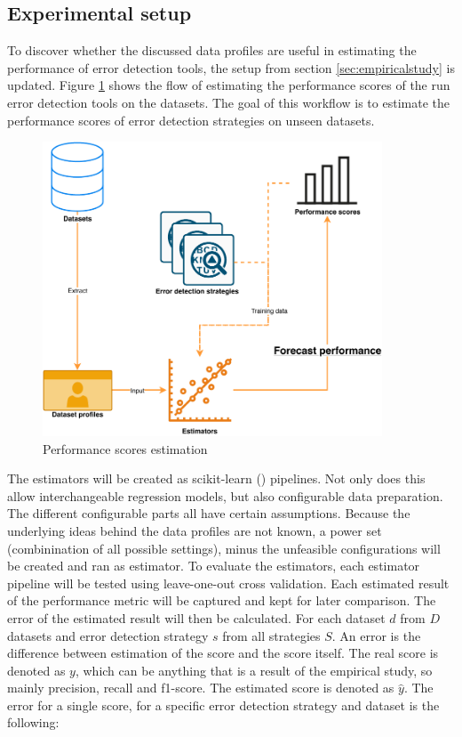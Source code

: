 \subsection{Experimental setup}
To discover whether the discussed data profiles are useful in estimating the performance of error detection tools, the setup from section \ref{sec:empiricalstudy} is updated. Figure \ref{fig:method_estimation} shows the flow of estimating the performance scores of the run error detection tools on the datasets. The goal of this workflow is to estimate the performance scores of error detection strategies on unseen datasets.


\begin{figure}%
	\centering
	\includegraphics[width=0.9\textwidth]{thesis/Figures/Method/PerformanceEstimation-Profiler.pdf}
	\caption{Performance scores estimation}
	\label{fig:method_estimation}
\end{figure}

The estimators will be created as scikit-learn (\cite{Pedregosa2011-su}) pipelines. Not only does this allow interchangeable regression models, but also configurable data preparation. The different configurable parts all have certain assumptions. Because the underlying ideas behind the data profiles are not known, a power set (combinination of all possible settings), minus the unfeasible configurations will be created and ran as estimator. 
To evaluate the estimators, each estimator pipeline will be tested using leave-one-out cross validation. Each estimated result of the performance metric will be captured and kept for later comparison. The error of the estimated result will then be calculated. For each dataset $d$ from $D$ datasets and error detection strategy $s$ from all strategies $S$. An error is the difference between estimation of the score and the score itself. The real score is denoted as $y$, which can be anything that is a result of the empirical study, so mainly precision, recall and f1-score. The estimated score is denoted as $\hat{y}$. The error for a single score, for a specific error detection strategy and dataset is the following:

